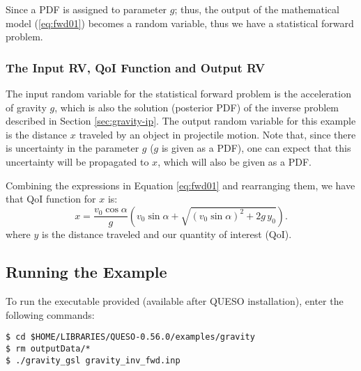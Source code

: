 Since a PDF is assigned to parameter $g$; thus, the output of the mathematical model (\ref{eq:fwd01})
becomes a random variable, thus we have a statistical forward problem.

\subsubsection{The Input RV, QoI Function and Output RV}

The input random variable for the statistical forward problem is the acceleration of gravity $g$,
which is also the solution (posterior PDF) of the inverse problem described in Section \ref{sec:gravity-ip}.
The output random variable for this example is the distance $x$ traveled by an object in projectile motion.
Note that, since there is uncertainty in the parameter $g$ ($g$ is given as a PDF), one can
expect that this uncertainty will be propagated to $x$, which will also be given as a PDF.

Combining the expressions in Equation \ref{eq:fwd01} and rearranging them, we have that QoI
function for $x$ %
is:
\begin{equation}\label{eq:fp_deterministic}
x=\dfrac{ v_0 \cos \alpha }{g} \left( v_0  \sin \alpha  + \sqrt{ ( v_0  \sin \alpha)^2 + 2g\, y_0 }\right).
\end{equation}
where $y$ is the distance traveled and our quantity of interest (QoI).

\subsection{Running the Example}\label{sec:gravity-run}

To run the executable provided (available after QUESO installation), enter the following commands:
\begin{lstlisting}[label={},caption={}]
$ cd $HOME/LIBRARIES/QUESO-0.56.0/examples/gravity
$ rm outputData/*
$ ./gravity_gsl gravity_inv_fwd.inp
\end{lstlisting}

